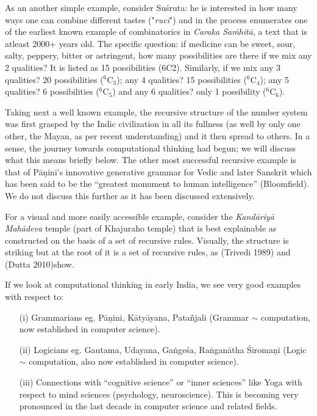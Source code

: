 As an another simple example, consider Suśruta: he is interested in how many ways one can combine different tastes ("\textsl{ruci}") and in the process enumerates one of the earliest known example of combinatorics in \textsl{Caraka Saṁhitā}, a text that is atleast 2000+ years old. The specific question: if medicine can be sweet, sour, salty, peppery, bitter or astringent, how many possibilities are there if we mix any 2 qualities? It is listed as 15 possibilities (6C2). Similarly, if we mix any 3 qualities? 20 possibilities ($^{6}$C$_{3}$); any 4 qualities? 15 possibilities ($^{6}$C$_{4}$); any 5 qualities? 6 possibilities ($^{6}$C$_{5}$) and any 6 qualities? only 1 possibility ($^{6}$C$_{6}$).

Taking next a well known example, the recursive structure of the number system was first grasped by the Indic civilization in all its fullness (as well by only one other, the Mayan, as per recent understanding) and it then spread to others. In a sense, the journey towards computational thinking had begun; we will discuss what this means briefly below. The other most successful recursive example is that of Pāṇini’s innovative generative grammar for Vedic and later Sanskrit which has been said to be the “greatest monument to human intelligence” (Bloomfield). We do not discuss this further as it has been discussed extensively.

For a visual and more easily accessible example, consider the \textsl{Kandāriyā Mahādeva} temple (part of Khajuraho temple) that is best explainable as constructed on the basis of a set of recursive rules. Visually, the structure is striking but at the root of it is a set of recursive rules, as (Trivedi 1989) and (Dutta 2010)show.

If we look at computational thinking in early India, we see very good examples with respect to:
\begin{itemize}
\item[(i)] Grammarians eg. Pāṇini, Kātyāyana, Patañjali (Grammar $\sim$ computation, now established in computer science).

\item[(ii)] Logicians eg. Gautama, Udayana, Gaṅgeśa, Raṅganātha Śiromaṇi (Logic $\sim$ computation, also now established in computer science).

\item[(iii)] Connections with “cognitive science” or “inner sciences” like Yoga with respect to mind sciences (psychology, neuroscience). This is becoming very pronounced in the last decade in computer science and related fields.
\end{itemize}

